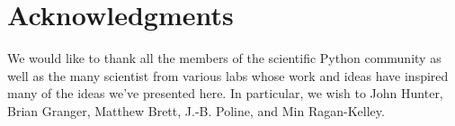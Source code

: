 \documentclass[ChapterTOCs,krantz2]{krantz} %
\begin{document}

\section*{Acknowledgments}
We would like to thank all the members of the scientific Python community
as well as the many scientist from various labs whose work and ideas have
inspired many of the ideas we've presented here.  In particular, we wish
to John Hunter, Brian Granger, Matthew Brett, J.-B. Poline, and Min Ragan-Kelley.



\end{document}
